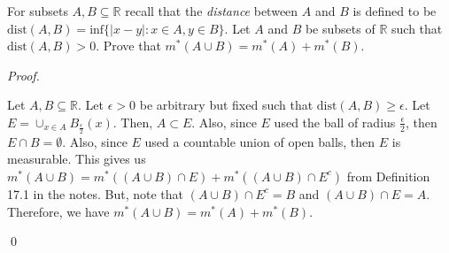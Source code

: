\documentclass[12pt]{article}
\newenvironment{problem}[2][Problem]{\begin{trivlist}
\item[\hskip \labelsep {\bfseries #1}\hskip \labelsep {\bfseries
#2.}]}{\end{trivlist}}
\newenvironment{lemma}[2][Lemma]{\begin{trivlist}
\item[\hskip \labelsep {\bfseries #1}\hskip \labelsep {\bfseries #2.}]}{\end{trivlist}}
\newenvironment{sol}
    {\emph{Proof.}
    }
    {
    \qed
    }
\begin{document}
  
  
  \begin{problem}{36}
  For subsets $A,B \subseteq \mathbb{R}$ recall that the \textit{distance} between $A$ and $B$ is defined to be $\text{dist}(A,B) = \text{inf}\{ \left| x - y \right| : x \in A, y \in B \}$. Let $A$ and $B$ be subsets of $\mathbb{R}$ such that $\text{dist}(A,B) > 0$. Prove that $m^*(A \cup B) = m^*(A) + m^*(B)$. 
  \end{problem}
  \begin{sol}
  Let $A,B \subseteq \mathbb{R}$. Let $\epsilon > 0$ be arbitrary but fixed such that $\text{dist}(A,B) \geq \epsilon$. Let $E = \cup_{x \in A}B_{\frac{\epsilon}{2}}(x)$. Then, $A \subset E$. Also, since $E$ used the ball of radius $\frac{\epsilon}{2}$, then $E \cap B = \emptyset$. Also, since $E$ used a countable union of open balls, then $E$ is measurable. This gives us $m^*(A \cup B) = m^*((A \cup B) \cap E) + m^*((A \cup B) \cap E^c)$ from Definition 17.1 in the notes. But, note that $(A \cup B) \cap E^c = B$ and $(A \cup B) \cap E = A$. Therefore, we have $m^*(A \cup B) = m^*(A) + m^*(B)$.
  \end{sol}
  
      
      
\end{document}
